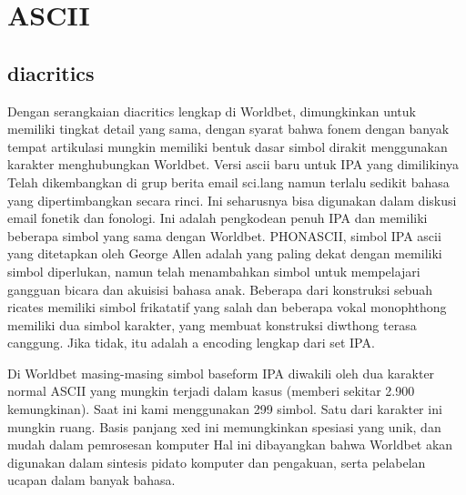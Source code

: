 \section{ASCII}
	\subsection{diacritics}
	Dengan serangkaian diacritics lengkap di Worldbet, dimungkinkan untuk memiliki tingkat detail yang sama,
dengan syarat bahwa fonem dengan banyak tempat artikulasi mungkin memiliki bentuk dasar
simbol dirakit menggunakan karakter menghubungkan Worldbet. Versi ascii baru untuk IPA yang dimilikinya
Telah dikembangkan di grup berita email sci.lang namun terlalu sedikit bahasa yang dipertimbangkan secara rinci. Ini seharusnya bisa digunakan dalam diskusi email
fonetik dan fonologi. Ini adalah pengkodean penuh IPA dan memiliki beberapa simbol yang sama dengan
Worldbet.
PHONASCII, simbol IPA ascii yang ditetapkan oleh George Allen adalah yang paling dekat dengan memiliki simbol
diperlukan, namun telah menambahkan simbol untuk mempelajari gangguan bicara dan akuisisi bahasa anak. Beberapa
dari konstruksi sebuah ricates memiliki simbol frikatatif yang salah dan beberapa vokal monophthong
memiliki dua simbol karakter, yang membuat konstruksi diwthong terasa canggung. Jika tidak, itu adalah a
encoding lengkap dari set IPA.

	Di Worldbet masing-masing simbol baseform IPA diwakili oleh dua karakter normal ASCII yang
mungkin terjadi dalam kasus (memberi sekitar 2.900 kemungkinan). Saat ini kami menggunakan 299 simbol. Satu dari
karakter ini mungkin ruang. Basis panjang xed ini memungkinkan spesiasi yang unik, dan mudah
dalam pemrosesan komputer Hal ini dibayangkan bahwa Worldbet akan digunakan dalam sintesis pidato komputer dan
pengakuan, serta pelabelan ucapan dalam banyak bahasa.